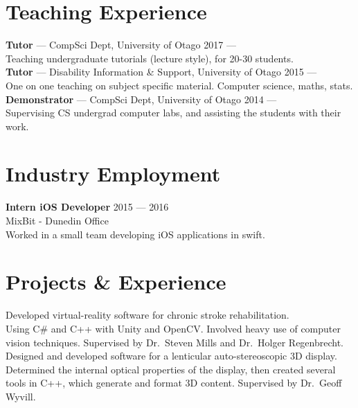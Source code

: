 \documentclass[a4paper, oneside, final]{scrartcl}
\begin{document}
    \endgroup
    
    \section{Teaching Experience}
    \noindent	
    \textbf{Tutor} --- CompSci Dept, University of Otago \hfill 2017 --- \\
	Teaching undergraduate tutorials (lecture style), for 20-30 students. \\
    
    \noindent	
    \textbf{Tutor} --- Disability Information \& Support, University of Otago  \hfill 2015 --- \\
	One on one teaching on subject specific material. Computer science, maths, stats. \\
    
	\noindent	
    \textbf{Demonstrator} --- 	CompSci Dept, University of Otago \hfill 2014 --- \\
	Supervising CS undergrad computer labs, and assisting the students with their work. \\
    
    \section {Industry Employment}
    \noindent	
	\textbf{Intern iOS Developer} \hfill 2015 --- 2016 \\
	MixBit - Dunedin Office \\
	Worked in a small team developing iOS applications in swift. \\
    
	\section{Projects \& Experience}
    
    \noindent        
	Developed virtual-reality software for chronic stroke rehabilitation.\\
	Using C\# and C++ with Unity and OpenCV. Involved heavy use of computer\\ vision techniques. Supervised by Dr.\ Steven Mills and Dr.\ Holger Regenbrecht.\\
    
	\noindent
	Designed and developed software for a lenticular auto-stereoscopic 3D display.\\ 
	Determined the internal optical properties of the display, then created several tools in C++, which generate and format 3D content. Supervised by Dr.\ Geoff Wyvill.\\
\end{document}
